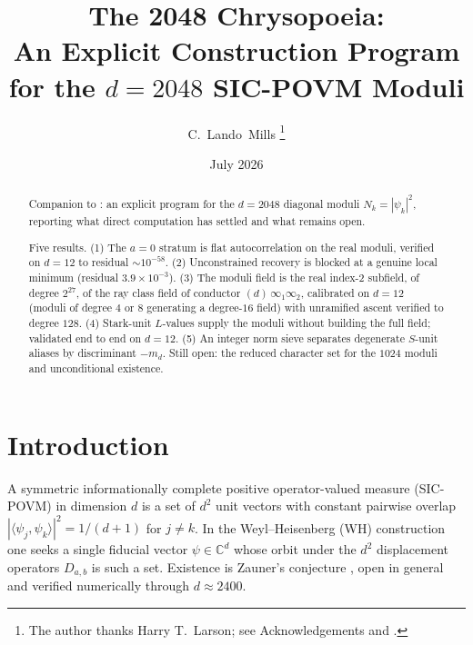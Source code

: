 \documentclass[12pt,a4paper]{article}
\newcommand{\md}{m_d}
\begin{document}
\title{\textbf{The 2048 Chrysopoeia:\\
An Explicit Construction Program for the $d=2048$ SIC-POVM Moduli}}

\author{C.\ Lando\ Mills%
\thanks{The author thanks Harry T.\ Larson; see Acknowledgements and \cite{Larson1961}.}}

\date{July 2026}

\maketitle

\begin{abstract}
Companion to \cite{StarkHilbert12}: an explicit program for the $d=2048$
diagonal moduli $N_k=|\psi_k|^2$, reporting what direct computation has
settled and what remains open.

Five results. (1) The $a=0$ stratum is flat autocorrelation on the real moduli,
verified on $d=12$ to residual $\sim 10^{-58}$. (2) Unconstrained recovery is
blocked at a genuine local minimum (residual $3.9\times 10^{-3}$). (3) The
moduli field is the real index-$2$ subfield, of degree $2^{27}$, of the ray
class field of conductor $(d)\,\infty_1\infty_2$, calibrated on $d=12$ (moduli
of degree $4$ or $8$ generating a degree-$16$ field) with unramified ascent
verified to degree $128$. (4) Stark-unit $L$-values supply the moduli without building the full
field; validated end to end on $d=12$. (5) An integer norm sieve separates
degenerate $S$-unit aliases by discriminant $-\md$. Still open: the reduced
character set for the $1024$ moduli and unconditional existence.
\end{abstract}

\newpage
\tableofcontents
\newpage

\section{Introduction}
\label{sec:intro}

A symmetric informationally complete positive operator-valued measure
(SIC-POVM) in dimension $d$ is a set of $d^2$ unit vectors with constant
pairwise overlap $|\langle \psi_j, \psi_k\rangle|^2 = 1/(d+1)$ for $j\neq k$.
In the Weyl--Heisenberg (WH) construction one seeks a single fiducial vector
$\psi\in\mathbb{C}^d$ whose orbit under the $d^2$ displacement operators
$D_{a,b}$ is such a set. Existence is Zauner's conjecture \cite{Zauner1999},
open in general and verified numerically through $d\approx 2400$.
\end{document}
